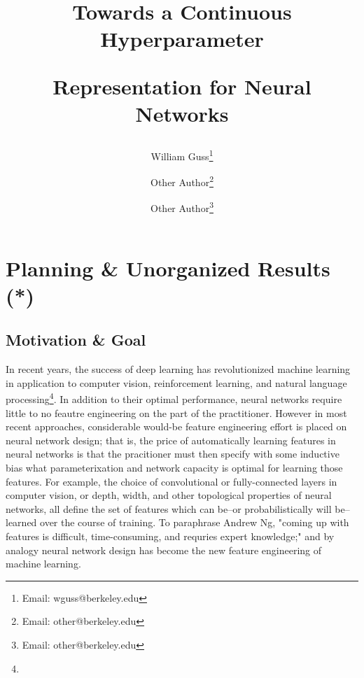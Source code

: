 \documentclass[12pt]{article}
\title{
 \begin{minipage}[c]{1.05\textwidth}
 	\centerline{Towards a Continuous Hyperparameter}
 	\centerline{Representation for Neural Networks}
 \end{minipage}
}
\author{
	\vspace{1cm}
	William Guss\thanks{Email: wguss@berkeley.edu} \and
	Other Author\thanks{Email: other@berkeley.edu} \and 
	Other Author\thanks{Email: other@berkeley.edu}
}
\newif\ifdraft
\begin{document}
\maketitle
\thispagestyle{empty}

\begin{abstract}
% 
\end{abstract}

\ifdraft
\newpage

\fi

\newpage
\thispagestyle{empty}

{\large
{}
\vspace*{\fill}
\tableofcontents
\vspace*{\fill}
}

\newpage

\setcounter{page}{1}


\section{Planning \& Unorganized Results (*)}
\subsection{Motivation \& Goal}


In recent years, the success of deep learning has revolutionized machine learning in application to computer vision, reinforcement learning, and natural language processing\footnote{}. In addition to their optimal performance, neural networks require little to no feautre engineering on the part of the practitioner. However in most recent approaches, considerable would-be feature engineering effort is placed on neural network design; that is, the price of automatically learning features in neural networks is that the pracitioner must then specify with some inductive bias what parameterixation and network capacity is optimal for learning those features. For example, the choice of convolutional or fully-connected layers in computer vision, or depth, width, and other topological properties of neural networks, all define the set of features which can be--or probabilistically will be--learned over the course of training.  To paraphrase Andrew Ng, "coming up with features is difficult, time-consuming, and requries expert knowledge;" and by analogy neural network design has become the new feature engineering of machine learning.
\end{document}
